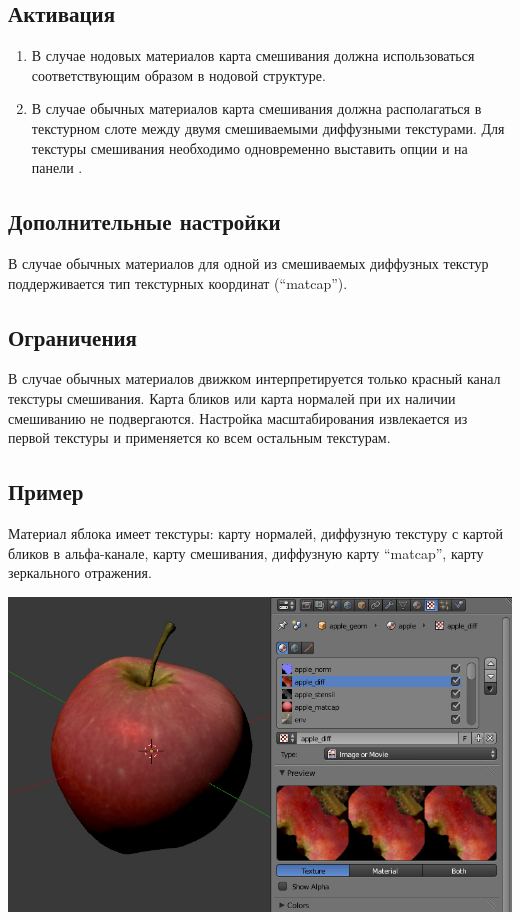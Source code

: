 \documentclass[a4paper,12pt,oneside]{sphinxmanual}
\begin{document}
\subsection{Активация}
\label{textures:id14}\begin{enumerate}
\item {} 
В случае нодовых материалов карта смешивания должна использоваться соответствующим образом в нодовой структуре.

\item {} 
В случае обычных материалов карта смешивания должна располагаться в текстурном слоте между двумя смешиваемыми диффузными текстурами. Для текстуры смешивания необходимо одновременно выставить опции  и  на панели .

\end{enumerate}


\subsection{Дополнительные настройки}
\label{textures:id15}
В случае обычных материалов для одной из смешиваемых диффузных текстур поддерживается тип текстурных координат  (``matcap'').


\subsection{Ограничения}
\label{textures:id16}
В случае обычных материалов движком интерпретируется только красный канал текстуры смешивания. Карта бликов или карта нормалей при их наличии смешиванию не подвергаются. Настройка масштабирования  извлекается из первой текстуры и применяется ко всем остальным текстурам.


\subsection{Пример}
\label{textures:id17}
Материал яблока имеет текстуры: карту нормалей, диффузную текстуру с картой бликов в альфа-канале, карту смешивания, диффузную карту ``matcap'', карту зеркального отражения.

{\hfill\includegraphics[width=1.000\linewidth]{stencil_apple.jpg}\hfill}
\end{document}
